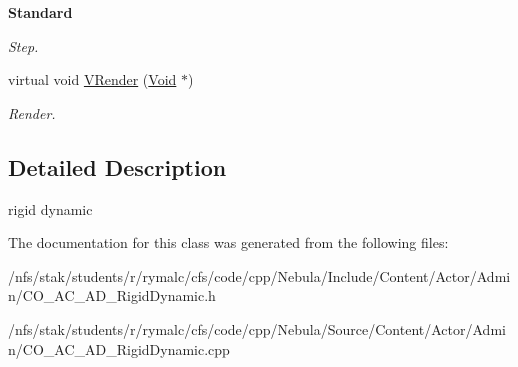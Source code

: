 \begin{Indent}{\bf Standard}
\begin{DoxyCompactItemize}
\begin{DoxyCompactList}\small\item\em Step. \item\end{DoxyCompactList}\item 
\hypertarget{classContent_1_1Actor_1_1Admin_1_1RigidDynamic_a8c53c250f8e991f3818be87126561e3f}{
virtual void \hyperlink{classContent_1_1Actor_1_1Admin_1_1RigidDynamic_a8c53c250f8e991f3818be87126561e3f}{VRender} (\hyperlink{structVoid}{Void} $\ast$)}
\label{classContent_1_1Actor_1_1Admin_1_1RigidDynamic_a8c53c250f8e991f3818be87126561e3f}

\begin{DoxyCompactList}\small\item\em Render. \item\end{DoxyCompactList}\end{DoxyCompactItemize}
\end{Indent}


\subsection{Detailed Description}
rigid dynamic 

The documentation for this class was generated from the following files:\begin{DoxyCompactItemize}
\item 
/nfs/stak/students/r/rymalc/cfs/code/cpp/Nebula/Include/Content/Actor/Admin/CO\_\-AC\_\-AD\_\-RigidDynamic.h\item 
/nfs/stak/students/r/rymalc/cfs/code/cpp/Nebula/Source/Content/Actor/Admin/CO\_\-AC\_\-AD\_\-RigidDynamic.cpp\end{DoxyCompactItemize}
